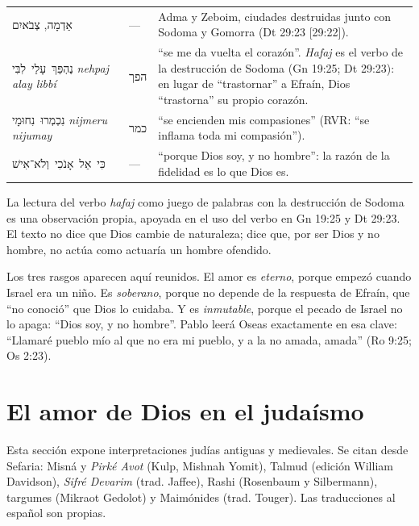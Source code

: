 \documentclass[11pt,letterpaper]{article}
\newcommand{\heb}[1]{\mbox{\foreignlanguage{hebrew}{#1}}}
\begin{document}
\begin{filologia}[Os 11:8--9]
\begin{tabular}{@{}L{3.6cm}L{1.6cm}L{9.6cm}@{}}
\heb{אַדְמָה}, \heb{צְבֹאיִם} & --- & Adma y Zeboim, ciudades destruidas junto con Sodoma y Gomorra (Dt 29:23 [29:22]). \\[2pt]
\heb{נֶהְפַּךְ עָלַי לִבִּי} \emph{nehpaj alay libbí} & \heb{הפך} & ``se me da vuelta el corazón''. \emph{Hafaj} es el verbo de la destrucción de Sodoma (Gn 19:25; Dt 29:23): en lugar de ``trastornar'' a Efraín, Dios ``trastorna'' su propio corazón. \\[2pt]
\heb{נִכְמְרוּ נִחוּמָי} \emph{nijmeru nijumay} & \heb{כמר} & ``se encienden mis compasiones'' (RVR: ``se inflama toda mi compasión''). \\[2pt]
\heb{כִּי אֵל אָנֹכִי וְלֹא־אִישׁ} & --- & ``porque Dios soy, y no hombre'': la razón de la fidelidad es lo que Dios es. \\
\end{tabular}
\end{filologia}

\begin{nota}[Precisión]
La lectura del verbo \emph{hafaj} como juego de palabras con la destrucción de Sodoma es una observación propia, apoyada en el uso del verbo en Gn 19:25 y Dt 29:23. El texto no dice que Dios cambie de naturaleza; dice que, por ser Dios y no hombre, no actúa como actuaría un hombre ofendido.
\end{nota}

Los tres rasgos aparecen aquí reunidos. El amor es \emph{eterno}, porque empezó cuando Israel era un niño. Es \emph{soberano}, porque no depende de la respuesta de Efraín, que ``no conoció'' que Dios lo cuidaba. Y es \emph{inmutable}, porque el pecado de Israel no lo apaga: ``Dios soy, y no hombre''. Pablo leerá Oseas exactamente en esa clave: ``Llamaré pueblo mío al que no era mi pueblo, y a la no amada, amada'' (Ro 9:25; Os 2:23).

\section{El amor de Dios en el judaísmo}\label{sec:judaismo-amor}

\begin{nota}[Precisión]
Esta sección expone interpretaciones judías antiguas y medievales. Se citan desde Sefaria: Misná y \emph{Pirké Avot} (Kulp, Mishnah Yomit), Talmud (edición William Davidson), \emph{Sifré Devarim} (trad. Jaffee), Rashi (Rosenbaum y Silbermann), targumes (Mikraot Gedolot) y Maimónides (trad. Touger). Las traducciones al español son propias.
\end{nota}
\end{document}
